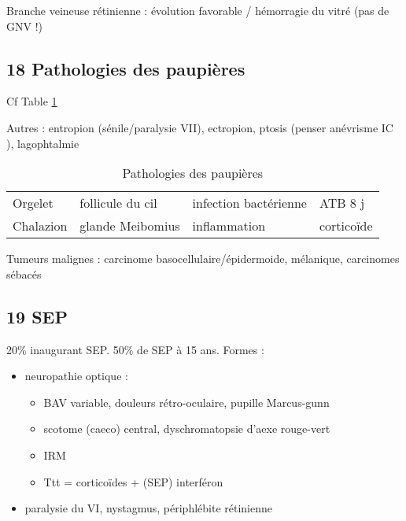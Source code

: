 \documentclass[11pt]{article}
\begin{document}
\begin{table}
\caption{Formes d'OVR}
\centering
{}
\label{org084fb55}
\end{table}

Branche veineuse rétinienne : évolution favorable / hémorragie du vitré (pas
  de GNV !)
\subsection{18 Pathologies des paupières}
\label{sec:orga2fc616}
Cf Table \ref{tab:org7eebd05}

Autres : entropion (sénile/paralysie VII), ectropion, ptosis (penser anévrisme
IC \faBomb), lagophtalmie

\begin{table}[htbp]
\caption{\label{tab:org7eebd05}
Pathologies des paupières}
\centering
\begin{tabular}{llll}
Orgelet & follicule du cil & infection bactérienne & ATB 8 j\\
Chalazion & glande Meibomius & inflammation & corticoïde\\
\end{tabular}
\end{table}
Tumeurs malignes : carcinome basocellulaire/épidermoide, mélanique, carcinomes sébacés
\subsection{19 SEP}
\label{sec:orgfc6641f}
20\% inaugurant SEP. 50\% de SEP à 15 ans. Formes :
\begin{itemize}
\item neuropathie optique : 
\begin{itemize}
\item BAV variable, douleurs rétro-oculaire, pupille Marcus-gunn
\item scotome (caeco) central, dyschromatopsie d'aexe rouge-vert
\item IRM
\item Ttt = corticoïdes + (SEP) interféron
\end{itemize}
\item paralysie du VI, nystagmus, périphlébite rétinienne
\end{itemize}
\end{document}
